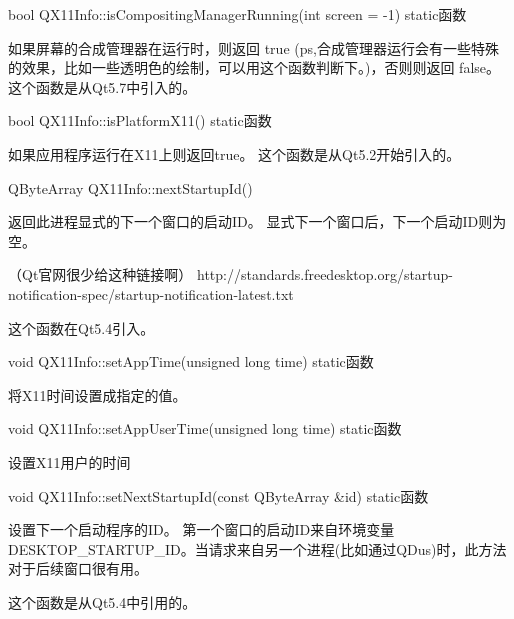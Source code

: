 bool QX11Info::isCompositingManagerRunning(int screen = -1) static函数

如果屏幕的合成管理器在运行时，则返回 true (ps,合成管理器运行会有一些特殊的效果，比如一些透明色的绘制，可以用这个函数判断下。)，否则则返回 false。 这个函数是从Qt5.7中引入的。

bool QX11Info::isPlatformX11() static函数

如果应用程序运行在X11上则返回true。 这个函数是从Qt5.2开始引入的。

QByteArray QX11Info::nextStartupId()

返回此进程显式的下一个窗口的启动ID。 显式下一个窗口后，下一个启动ID则为空。

（Qt官网很少给这种链接啊） http://standards.freedesktop.org/startup-notification-spec/startup-notification-latest.txt

这个函数在Qt5.4引入。

void QX11Info::setAppTime(unsigned long time) static函数

将X11时间设置成指定的值。

void QX11Info::setAppUserTime(unsigned long time) static函数

设置X11用户的时间

void QX11Info::setNextStartupId(const QByteArray \&id) static函数

设置下一个启动程序的ID。 第一个窗口的启动ID来自环境变量DESKTOP\_STARTUP\_ID。当请求来自另一个进程(比如通过QDus)时，此方法对于后续窗口很有用。

这个函数是从Qt5.4中引用的。





